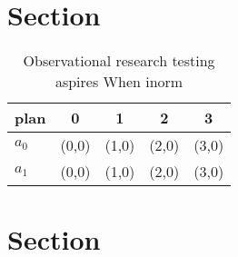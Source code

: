 \documentclass[a4paper]{article}
\begin{document}
\section{Section}

\begin{table}
\begin{adjustbox}{width=0.7\columnwidth}
\begin{tabular}{|l|l|l|l|l|}
\hline
\textbf{plan} & \multicolumn{1}{c|}{\textbf{0}} & \multicolumn{1}{c|}{\textbf{1}} & \multicolumn{1}{c|}{\textbf{2}} & \multicolumn{1}{c|}{\textbf{3}} \\ \hline
\textbf{$a_0$}  & (0,0) & (1,0) & (2,0) & (3,0) \\ \hline
\textbf{$a_1$}  & (0,0) & (1,0) & (2,0) & (3,0) \\ \hline
\end{tabular}
\end{adjustbox}
\caption{Observational research testing aspires When inorm
}
\end{table}

\section{Section}
\end{document}
